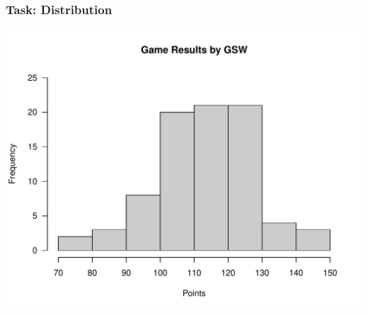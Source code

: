 \documentclass[12pt]{beamer}\usepackage[]{graphicx}\usepackage[]{color}
\makeatletter
\def\maxwidth{ %
  \ifdim\Gin@nat@width>\linewidth
    \linewidth
  \else
    \Gin@nat@width
  \fi
}
\newenvironment{knitrout}{}{} %
\makeatother
\begin{document}
\begin{frame}[fragile]
\frametitle{Task: Distribution}

\begin{knitrout}\footnotesize
{}\color{fgcolor}

{\centering \includegraphics[width=\maxwidth]{figure/task_distrib1-1} 

}



\end{knitrout}

\end{frame}

\end{document}
